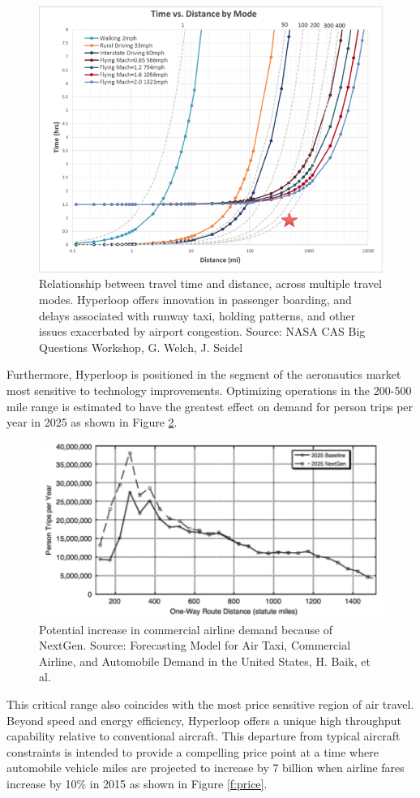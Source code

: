\documentclass[heading.tex]{subfiles}
\begin{document}
\begin{figure}[hbtp]
\centering
\includegraphics[width=.75\textwidth]{images/Seidel.png}
 \caption[Time]{Relationship between travel time and distance, across multiple travel modes. Hyperloop offers innovation in passenger boarding, and delays associated with runway taxi, holding patterns, and other issues exacerbated by airport congestion. Source: NASA CAS Big Questions Workshop, G. Welch, J. Seidel}
\label{f:time}
\end{figure}

Furthermore, Hyperloop is positioned in the segment of the aeronautics market most sensitive to technology improvements. Optimizing operations in the 200-500 mile range is estimated to have the greatest effect on demand for person trips per year in 2025 as shown in Figure \ref{f:demand}.

\begin{figure}[hbtp]
\centering
\includegraphics[width=.75\textwidth]{images/demand.png}
 \caption[demand]{Potential increase in commercial airline demand because of NextGen. Source: Forecasting Model for Air Taxi, Commercial Airline, and Automobile Demand in the United States, H. Baik, et al.}
\label{f:demand}
\end{figure}

This critical range also coincides with the
most price sensitive region of air travel.
Beyond speed and energy efficiency,
Hyperloop offers a unique high throughput
capability relative to conventional aircraft.
This departure from typical aircraft constraints
is intended to provide a compelling price point
at a time where automobile vehicle miles are
projected to increase by 7 billion when airline
fares increase by 10\% in 2015 as shown in Figure \ref{f:price}.
\end{document}
